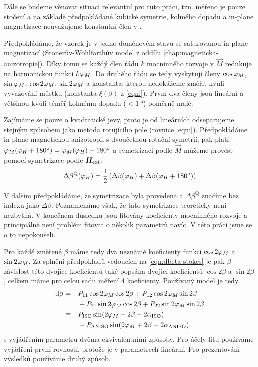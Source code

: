 Dále se budeme věnovat situaci relevantní pro tuto práci, tzn. měřeno je pouze stočení a na základě předpokládané kubické symetrie, kolmého dopadu a in-plane magnetizace neuvažujeme konstantní člen v \label{eqn:dbeta-stokes}.

Předpokládáme, že vzorek je v jedno-doménovém stavu se saturovanou in-plane magnetizací (Stonerův-Wohlfarthův model z oddílu \ref{chap:magneticka-anizotropie}).
Díky tomu se každý člen řádu $k$ mocninného rozvoje v $\vec{M}$ redukuje na harmonickou funkci $k\varphi_M$.
Do druhého řádu se tedy vyskytují členy $\cos\varphi_M$, $\sin\varphi_M$, $\cos2\varphi_M$, $\sin2\varphi_M$ a konstanta, kterou nedokážeme změřit kvůli vyvažování můstku (konstanta $\xi(\beta)$ z \eqref{eqn:}).
První dva členy jsou lineární a většinou kvůli téměř kolmému dopadu ($< \SI{1}{\degree}$) poměrně malé.

Zajímáme se pouze o kvadratické jevy, proto je od lineárních odseparujeme stejným způsobem jako metoda rotujícího pole (rovnice \eqref{eqn:}).
Předpokládáme in-plane magnetickou anizotropii s dvoučetnou rotační symetrií, pak platí $\varphi_M(\varphi_H+\SI{180}{\degree})=\varphi_M(\varphi_H)+\SI{180}{\degree}$ a symetrizaci podle $\vec{M}$ můžeme provést pomocí symetrizace podle $\bm{H}_\textrm{ext}$:
\begin{equation}
    \Delta\beta^\textrm{Q}(\varphi_H) = \frac{1}{2}\left(\Delta\beta(\varphi_H) + \Delta\beta(\varphi_H+\SI{180}{\degree})\right)
\end{equation}

V dalším předpokládáme, že symetrizace byla provedena a $\Delta\beta^\textrm{Q}$ značíme bez indexu jako $\Delta\beta$.
Poznamenáme však, že tato symetrizace teoreticky není nezbytná.
V konečném důsledku jsou fitovány koeficienty mocninného rozvoje a principiálně není problém fitovat o několik parametrů navíc.
V této práci jsme se o to nepokoušeli.

Pro každé změřené $\beta$ máme tedy dva neznámé koeficienty funkcí $\cos2\varphi_M$ a $\sin2\varphi_M$.
Za splnění předpokladů vedoucích na \eqref{eqn:dbeta-stokes} je pak $\beta$-závislost této dvojice koeficientů také popsána dvojicí koeficientů $\cos2\beta$ a $\sin2\beta$, celkem máme pro celou sadu měření 4 koeficienty.
Používaný model je tedy
\begin{alignat}{2}
    \textrm{d}\beta &= && P_{11} \cos2\varphi_M\cos2\beta + P_{12}\cos2\varphi_M\sin2\beta \\
                    & && + P_{21}\sin2\varphi_M\cos2\beta + P_{22}\sin2\varphi_M\sin2\beta \\
                    &\equiv & & P_\textrm{ISO} \sin(2\varphi_M - 2\beta - 2\alpha_\textrm{ISO}) \\
                    &  & & + P_\textrm{ANISO} \sin(2\varphi_M + 2\beta - 2\alpha_\textrm{ANISO})
\end{alignat}
s vyjádřením parametrů dvěma ekvivalentními způsoby.
Pro účely fitu používáme vyjádření první rovností, protože je v parametrech lineární.
Pro prezentování výsledků používáme druhý způsob.

